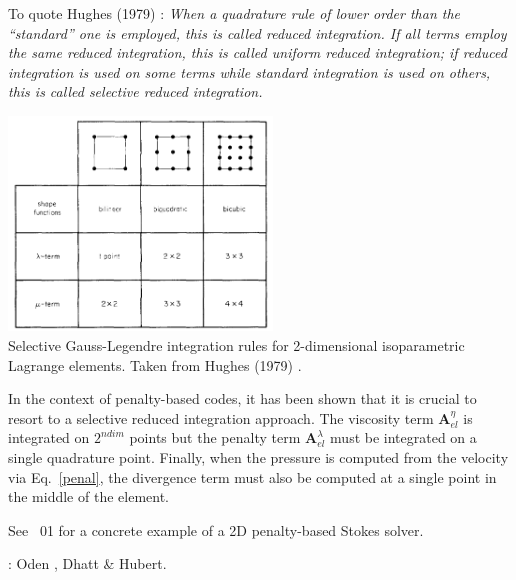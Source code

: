 To quote Hughes \etal (1979) \cite{hulb79}: {\it When a quadrature rule of lower order than the ``standard'' one
is employed, this is called reduced integration. If all terms employ the same reduced
integration, this is called uniform reduced integration; if reduced integration is used
on some terms while standard integration is used on others, this is called selective reduced integration.}

\begin{center}
\includegraphics[width=7cm]{images/penalty/hulb79}\\
{\captionfont Selective Gauss-Legendre integration rules for 2-dimensional isoparametric Lagrange
elements. Taken from Hughes \etal (1979) \cite{hulb79}.}
\end{center}

In the context of penalty-based codes, it has been shown \cite{mahu78} that it is crucial to resort 
to a selective reduced integration approach. 
The viscosity term ${\bm A}_{el}^\eta$ is integrated on $2^{ndim}$ points but the 
penalty term ${\bm A}_{el}^\lambda$ must be integrated on a single quadrature point.
Finally, when the pressure is computed from the velocity via Eq.~\eqref{penal}, 
the divergence term must also be computed at a single point in the middle of the element.

See \stone~01 for a concrete example of a 2D penalty-based Stokes solver.

\Literature: Oden \etal \cite{odks82}, Dhatt \& Hubert\cite{dhhu86}.
